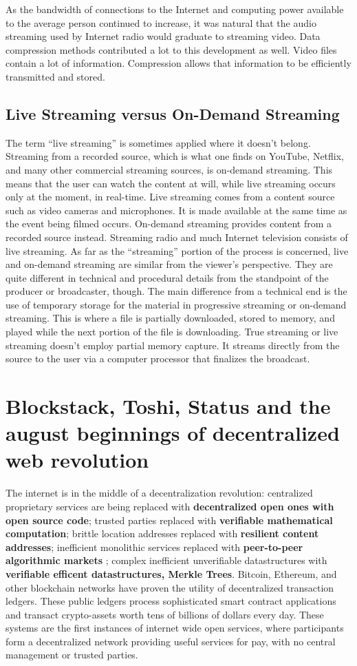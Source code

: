 \documentclass{article}
\begin{document}
As the bandwidth of connections to the Internet and computing power available to the average person continued to increase, it was natural that the audio streaming used by Internet radio would graduate to streaming video. Data compression methods contributed a lot to this development as well. Video files contain a lot of information. Compression allows that information to be efficiently transmitted and stored.

\subsection{Live Streaming versus On-Demand Streaming}
The term “live streaming” is sometimes applied where it doesn’t belong. Streaming from a recorded source, which is what one finds on YouTube, Netflix, and many other commercial streaming sources, is on-demand streaming. This means that the user can watch the content at will, while live streaming occurs only at the moment, in real-time. Live streaming comes from a content source such as video cameras and microphones. It is made available at the same time as the event being filmed occurs. On-demand streaming provides content from a recorded source instead. Streaming radio and much Internet television consists of live streaming.
As far as the “streaming” portion of the process is concerned, live and on-demand streaming are similar from the viewer’s perspective. They are quite different in technical and procedural details from the standpoint of the producer or broadcaster, though. The main difference from a technical end is the use of temporary storage for the material in progressive streaming or on-demand streaming. This is where a file is partially downloaded, stored to memory, and played while the next portion of the file is downloading. True streaming or live streaming doesn’t employ partial memory capture. It streams directly from the source to the user via a computer processor that finalizes the broadcast.

\section{Blockstack, Toshi, Status and the august beginnings of decentralized
  web revolution}
  The internet is in the middle of a decentralization revolution: centralized proprietary services are being replaced with \textbf{decentralized open ones with open source code}; trusted parties replaced with \textbf{verifiable mathematical computation}; brittle location addresses replaced with \textbf{resilient content addresses}; inefficient monolithic services replaced with \textbf{peer-to-peer algorithmic markets} ; complex inefficient unverifiable datastructures with \textbf{verifiable efficent datastructures, Merkle Trees}. Bitcoin, Ethereum, and other blockchain networks have proven the utility of decentralized transaction ledgers. These public ledgers process sophisticated smart contract applications and transact crypto-assets worth tens of billions of dollars every day. These systems are the first instances of internet wide open services, where participants form a decentralized network providing useful services for pay, with no central management or trusted parties.
  
\end{document}
